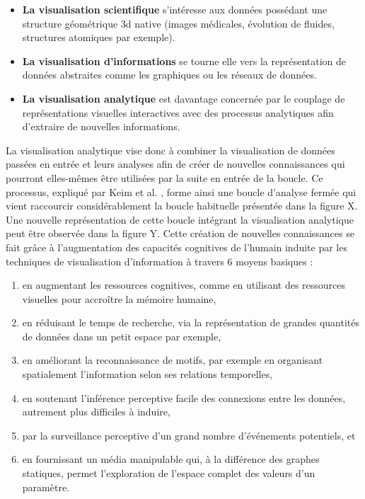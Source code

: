 \begin{itemize}
	\item \textbf{La visualisation scientifique} s'intéresse aux données possédant une structure géométrique 3d native (images médicales, évolution de fluides, structures atomiques par exemple).
	\item \textbf{La visualisation d'informations} se tourne elle vers la représentation de données abstraites comme les graphiques ou les réseaux de données.
	\item \textbf{La visualisation analytique} est davantage concernée par le couplage de représentations visuelles interactives avec des processus analytiques afin d'extraire de nouvelles informations.
\end{itemize}

La visualisation analytique vise donc à combiner la visualisation de données passées en entrée et leurs analyses afin de créer de nouvelles connaissances qui pourront elles-mêmes être utilisées par la suite en entrée de la boucle. Ce processus, expliqué par Keim et al. \cite{keim2010mastering}, forme ainsi une boucle d'analyse fermée qui vient raccourcir considérablement la boucle habituelle présentée dans la figure X. Une nouvelle représentation de cette boucle intégrant la visualisation analytique peut être observée dans la figure Y.
Cette création de nouvelles connaissances se fait grâce à l'augmentation des capacités cognitives de l'humain induite par les techniques de visualisation d'information à travers 6 moyens basiques \cite{card1999readings,cook_illuminating_2005}:

\begin{enumerate}
	\item en augmentant les ressources cognitives, comme en utilisant des ressources visuelles pour accroître la mémoire humaine,
	\item en réduisant le temps de recherche, via la représentation de grandes quantités de données dans un petit espace par exemple,
	\item en améliorant la reconnaissance de motifs, par exemple en organisant spatialement l'information selon ses relations temporelles,
	\item en soutenant l'inférence perceptive facile des connexions entre les données, autrement plus difficiles à induire,
	\item par la surveillance perceptive d'un grand nombre d'événements potentiels, et
	\item en fournissant un média manipulable qui, à la différence des graphes statiques, permet l'exploration de l'espace complet des valeurs d'un paramètre.
\end{enumerate}

